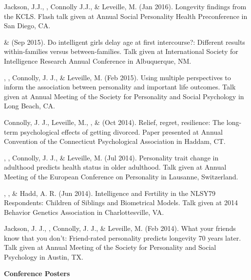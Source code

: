 \begin{etaremune}
\item Jackson, J.J., \meb, Connolly J.J., \& Leveille, M. (Jan 2016). Longevity findings from the KCLS. Flash talk given at Annual Social Personality Health Preconference in San Diego, CA. %
%
\item \joe \& \meb (Sep 2015). Do intelligent girls delay age at first intercourse?: Different results within-families versus between-families. Talk given at International Society for Intelligence Research Annual Conference in Albuquerque, NM.

\item \jjj, \meb, Connolly, J. J., \& Leveille, M. (Feb 2015). Using multiple perspectives to inform the association between personality and important life outcomes. Talk given at Annual Meeting of the Society for Personality and Social Psychology in Long Beach, CA.
%

\item Connolly, J. J., Leveille, M., \meb, \& \jjj (Oct 2014). Relief, regret, resilience: The long-term psychological effects of getting divorced. Paper presented at Annual Convention of the Connecticut Psychological Association in Haddam, CT.

\item \jjj, \meb, Connolly, J. J., \& Leveille, M. (Jul 2014). Personality trait change in adulthood predicts health status in older adulthood. Talk given at Annual Meeting of the European Conference on Personality in Lausanne, Switzerland.
%
\item \joe, \meb, \& Hadd, A. R. (Jun 2014). Intelligence and Fertility in the NLSY79 Respondents: Children of Siblings and Biometrical Models. Talk given at 2014 Behavior Genetics Association in Charlottesville, VA.

\item Jackson, J. J., \meb, Connolly, J. J., \& Leveille, M. (Feb 2014). What your friends know that you don't: Friend-rated personality predicts longevity 70 years later. Talk given at Annual Meeting of the Society for Personality and Social Psychology in Austin, TX.
\end{etaremune}
{\large {\bf Conference Posters}}
